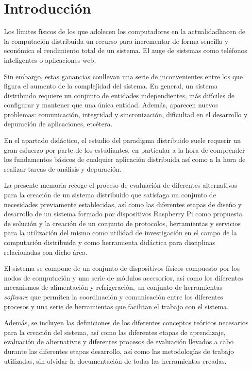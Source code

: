 \chapter{Introducción}

Los límites físicos de los que adolecen los computadores en la actualidad\citationneeded hacen de la computación distribuida un recurso para incrementar de forma sencilla y económica el rendimiento total de un sistema. El auge de sistemas como teléfonos inteligentes o aplicaciones web. 

Sin embargo, estas ganancias conllevan una serie de inconvenientes entre los que figura el aumento de la complejidad del sistema. En general, un sistema distribuido requiere un conjunto de entidades independientes, más difíciles de configurar y mantener que una única entidad. Además, aparecen nuevos problemas: comunicación, integridad y sincronización, dificultad en el desarrollo y depuración de aplicaciones, etcétera.

En el apartado didáctico, el estudio del paradigma distribuido suele requerir un gran esfuerzo por parte de los estudiantes, en particular a la hora de comprender los fundamentos básicos de cualquier aplicación distribuida así como a la hora de realizar tareas de análisis y depuración.

La presente memoria recoge el proceso de evaluación de diferentes alternativas para la creación de un sistema distribuido que satisfaga un conjunto de necesidades previamente establecidas, así como las diferentes etapas de diseño y desarrollo de un sistema formado por dispositivos Raspberry Pi como propuesta de solución y la creación de un conjunto de protocolos, herramientas y servicios para la utilización del mismo como utilidad de investigación en el campo de la computación distribuida y como herramienta didáctica para disciplinas relacionadas con dicho área.

El sistema se compone de un conjunto de dispositivos físicos compuesto por los nodos de computación y una serie de módulos accesorios, así como los diferentes mecanismos de alimentación y refrigeración, un conjunto de herramientas \textit{software} que permiten la coordinación y comunicación entre los diferentes procesos y una serie de herramientas que facilitan el trabajo con el sistema.

Además, se incluyen las definiciones de los diferentes conceptos teóricos necesarios para la creación del sistema, así como las diferentes etapas de aprendizaje, evaluación de alternativas y diferentes procesos de evaluación llevados a cabo durante las diferentes etapas desarrollo, así como las metodologías de trabajo utilizadas, sin olvidar la documentación de todas las herramientas creadas.